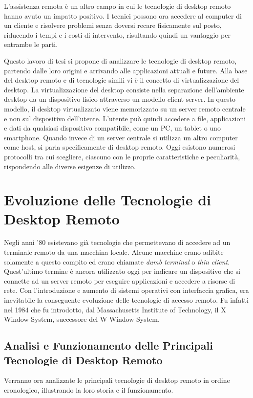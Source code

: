 \documentclass[12pt,a4paper,openright,twoside]{book}
\begin{document}
L'assistenza remota è un altro campo in cui le tecnologie di desktop remoto hanno avuto un impatto positivo.
%
I tecnici possono ora accedere al computer di un cliente e risolvere problemi senza doversi recare fisicamente sul posto,
riducendo i tempi e i costi di intervento,
risultando quindi un vantaggio per entrambe le parti.

Questo lavoro di tesi si propone di analizzare le tecnologie di desktop remoto,
partendo dalle loro origini e arrivando alle applicazioni attuali e future.
%
Alla base del desktop remoto e di tecnologie simili vi è il concetto di virtualizzazione del desktop.
La virtualizzazione del desktop consiste nella separazione dell'ambiente desktop da un dispositivo fisico attraverso un modello client-server.
In questo modello, il desktop virtualizzato viene memorizzato su un server remoto centrale e non sul dispositivo dell'utente.
L'utente può quindi accedere a file,
applicazioni e dati da qualsiasi dispositivo compatibile,
come un \ac{PC},
un tablet o uno smartphone. %
Quando invece di un server centrale si utilizza un altro computer come host,
si parla specificamente di desktop remoto.
%
Oggi esistono numerosi protocolli tra cui scegliere,
ciascuno con le proprie caratteristiche e peculiarità,
rispondendo alle diverse esigenze di utilizzo.



\chapter{Evoluzione delle Tecnologie di Desktop Remoto}
\label{chap:evolution}
Negli anni '80 esistevano già tecnologie che permettevano di accedere ad un terminale remoto da una macchina locale.
Alcune macchine erano adibite solamente a questo compito ed erano chiamate \emph{dumb terminal} o \emph{thin client}.
%
Quest'ultimo termine è ancora utilizzato oggi per indicare un dispositivo che si connette ad un server remoto per eseguire applicazioni e accedere a risorse di rete.
Con l'introduzione e aumento di sistemi operativi con interfaccia grafica, era inevitabile la conseguente evoluzione delle tecnologie di accesso remoto.
%
Fu infatti nel 1984 che fu introdotto, dal Massachusetts Institute of Technology, il X Window System, successore del W Window System.

\section{Analisi e Funzionamento delle Principali Tecnologie di Desktop Remoto} 
Verranno ora analizzate le principali tecnologie di desktop remoto in ordine cronologico, illustrando la loro storia e il funzionamento.
\end{document}
